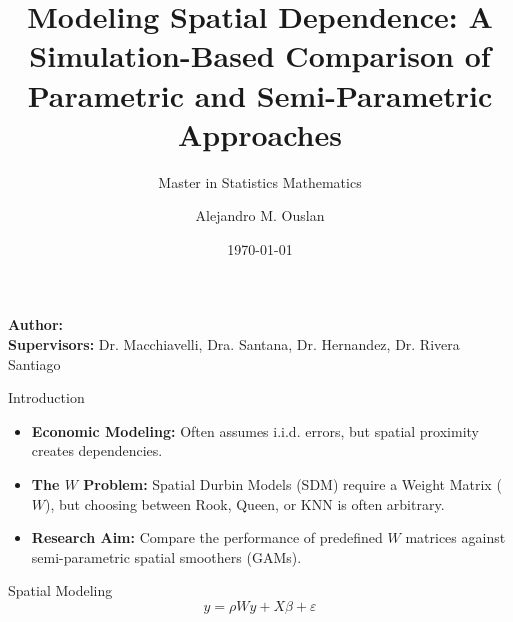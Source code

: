 \documentclass[12pt]{beamer}
\title[Modeling Spatial Dependence]{Modeling Spatial Dependence: A Simulation-Based Comparison of Parametric and Semi-Parametric Approaches}
\subtitle{Master in Statistics Mathematics}
\author[Alejandro M. Ouslan]{Alejandro M. Ouslan}
\institute[UPR Mayagüez]{University of Puerto Rico, Mayagüez}
\date{\today}
\begin{document}
\begin{frame}{}
	\vspace{\fill}
	\centering

	\vspace{\fill}
	\Large \color{main} \textbf{\inserttitle}

	\medskip
	\large \color{black} \insertsubtitle

	\vspace{\fill}
	\footnotesize \insertinstitute

	\vspace{\fill}
	\textbf{Author:} \insertauthor \\
	\textbf{Supervisors:} Dr. Macchiavelli, Dra. Santana, Dr. Hernandez, Dr. Rivera Santiago

	\medskip
	\insertdate
	\vspace{\fill}
\end{frame}

\begin{frame}{Introduction}
	\begin{itemize}
		\item \textbf{Economic Modeling:} Often assumes i.i.d. errors, but spatial proximity creates dependencies.
		\item \textbf{The $W$ Problem:} Spatial Durbin Models (SDM) require a Weight Matrix ($W$), but choosing between Rook, Queen, or KNN is often arbitrary.
		\item \textbf{Research Aim:} Compare the performance of predefined $W$ matrices against semi-parametric spatial smoothers (GAMs).
	\end{itemize}
\end{frame}

\begin{frame}{Spatial Modeling}
	$$y = \rho Wy + X\beta + \varepsilon$$
\end{frame}
\end{document}
